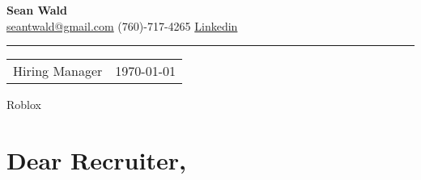 \documentclass[]{article}
\begin{document}
\begin{center}
    \Large{\textbf{Sean Wald}} \\
    \small{\href{mailto:seantwald@gmail.com}{seantwald@gmail.com} \textbar (760)-717-4265 \textbar \href{https://www.linkedin.com/in/seantowald/}{Linkedin}} \\
\end{center}
\hrule

%
%
\hfill

\begin{flushleft}
    \begin{tabular}{@{}p{}@{}p{}@{}}
        Hiring Manager & \hfill\today\\
    \end{tabular}
    Roblox\\


\end{flushleft}

\section*{Dear Recruiter,}


\end{document}
